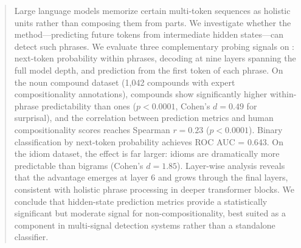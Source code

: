 \begin{abstract}
Large language models memorize certain multi-token sequences as holistic units rather than composing them from parts.
We investigate whether the \futurelens method---predicting future tokens from intermediate hidden states---can detect such \noncomp phrases.
We evaluate three complementary probing signals on \gptxl: next-token probability within phrases, \logitlens decoding at nine layers spanning the full model depth, and \futurelens prediction from the first token of each phrase.
On the \farahmand noun compound dataset (1,042 compounds with expert compositionality annotations), \noncomp compounds show significantly higher within-phrase predictability than \comp ones ($p < 0.0001$, Cohen's $d = 0.49$ for surprisal), and the correlation between prediction metrics and human compositionality scores reaches Spearman $r = 0.23$ ($p < 0.0001$).
Binary classification by next-token probability achieves ROC AUC = 0.643.
On the \idiomem idiom dataset, the effect is far larger: idioms are dramatically more predictable than \comp bigrams (Cohen's $d = 1.85$).
Layer-wise analysis reveals that the \noncomp advantage emerges at layer 6 and grows through the final layers, consistent with holistic phrase processing in deeper transformer blocks.
We conclude that hidden-state prediction metrics provide a statistically significant but moderate signal for non-compositionality, best suited as a component in multi-signal detection systems rather than a standalone classifier.
\end{abstract}
